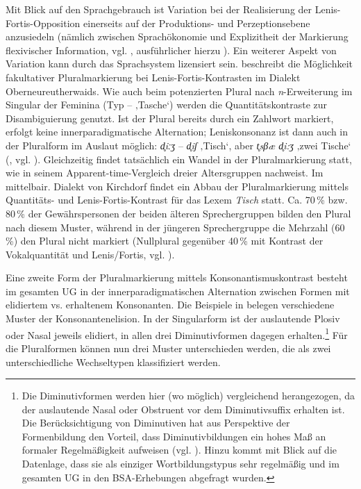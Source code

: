 Mit Blick auf den Sprachgebrauch ist Variation bei der Realisierung der Lenis-Fortis-Opposition einerseits auf der Produktions- und Perzeptionsebene anzusiedeln (nämlich zwischen Sprach\-ökonomie und Explizitheit der Markierung flexivischer Information, vgl. \citealt[88]{Seiler2018}, ausführlicher hierzu ). Ein weiterer Aspekt von Variation kann durch das Sprachsystem lizensiert sein. \citet[124]{Steininger1994} beschreibt die Möglichkeit fakultativer Pluralmarkierung bei Lenis-Fortis-Kontrasten im Dialekt Oberneureutherwaids. Wie auch beim potenzierten Plural nach \textit{n}{}-Erweiterung im Singular der Feminina (Typ  --  ‚Tasche‘) werden die Quantitätskontraste zur Disambiguierung genutzt. Ist der Plural bereits durch ein Zahlwort markiert, erfolgt keine innerparadigmatische Alternation; Leniskonsonanz ist dann auch in der Pluralform im Auslaut möglich: \textit{d̥iːʒ} -- \textit{d̥iʃ} ‚Tisch‘, aber \textit{t̥sβæ d̥i:ʒ} ‚zwei Tische‘ (\citealt[124]{Steininger1994}, vgl. ). Gleichzeitig findet tatsächlich ein Wandel in der Pluralmarkierung statt, wie \citet{Wildfeuer2001} in seinem Apparent-time-Vergleich dreier Altersgruppen nachweist. Im mittelbair. Dialekt von Kirchdorf findet ein Abbau der Pluralmarkierung mittels Quantitäts- und Lenis-Fortis-Kontrast für das Lexem \textit{Tisch} statt. Ca. 70\,\% bzw. 80\,\% der Gewährspersonen der beiden älteren Sprechergruppen bilden den Plural nach diesem Muster, während in der jüngeren Sprechergruppe die Mehrzahl (60\,\%) den Plural nicht markiert (Nullplural gegenüber 40\,\% mit Kontrast der Vokalquantität und Lenis/Fortis, vgl. \citealt[189--190]{Wildfeuer2001}).

\label{sec:7.1.2.3.2}\largerpage
Eine zweite Form der Pluralmarkierung mittels Konsonantismuskontrast besteht im gesamten UG in der innerparadigmatischen Alternation zwischen Formen mit elidiertem vs. erhaltenem Konsonanten. Die Beispiele in  belegen verschiedene Muster der Konsonantenelision. In der Singularform ist der auslautende Plosiv oder Nasal jeweils elidiert, in allen drei Diminutivformen dagegen erhalten.\footnote{Die Diminutivformen werden hier (wo möglich) vergleichend herangezogen, da der auslautende Nasal oder Obstruent vor dem Diminutivsuffix erhalten ist. Die Berücksichtigung von Diminutiven hat aus Perspektive der Formenbildung den Vorteil, dass Diminutivbildungen ein hohes Maß an formaler Regelmäßigkeit aufweisen (vgl. \citealt[110]{Rowley1997}). Hinzu kommt mit Blick auf die Datenlage, dass sie als einziger Wortbildungstypus sehr regelmäßig und im gesamten UG in den BSA-Erhebungen abgefragt wurden.} Für die Pluralformen können nun drei Muster unterschieden werden, die als zwei unterschiedliche Wechseltypen klassifiziert werden.


